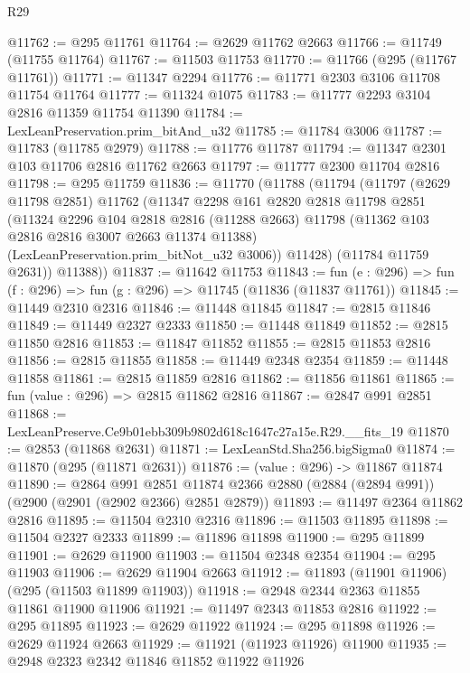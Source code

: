 \begin{lexlean}{R29}
\begin{coremodule}
@11762 := @295 @11761
@11764 := @2629 @11762 @2663
@11766 := @11749 (@11755 @11764)
@11767 := @11503 @11753
@11770 := @11766 (@295 (@11767 @11761))
@11771 := @11347 @2294
@11776 := @11771 @2303 @3106 @11708 @11754 @11764
@11777 := @11324 @1075
@11783 := @11777 @2293 @3104 @2816 @11359 @11754 @11390
@11784 := LexLeanPreservation.prim_bitAnd_u32
@11785 := @11784 @3006
@11787 := @11783 (@11785 @2979)
@11788 := @11776 @11787
@11794 := @11347 @2301 @103 @11706 @2816 @11762 @2663
@11797 := @11777 @2300 @11704 @2816
@11798 := @295 @11759
@11836 := @11770
    (@11788
      (@11794
        (@11797
          (@2629 @11798 @2851)
          @11762
          (@11347
            @2298
            @161
            @2820
            @2818
            @11798
            @2851
            (@11324
              @2296
              @104
              @2818
              @2816
              (@11288 @2663)
              @11798
              (@11362 @103 @2816 @2816 @3007 @2663 @11374 @11388)
              (LexLeanPreservation.prim_bitNot_u32 @3006))
            @11428)
          (@11784 @11759 @2631))
        @11388))
@11837 := @11642 @11753
@11843 := fun (e : @296) => fun (f : @296) => fun (g : @296) => @11745 (@11836 (@11837 @11761))
@11845 := @11449 @2310 @2316
@11846 := @11448 @11845
@11847 := @2815 @11846
@11849 := @11449 @2327 @2333
@11850 := @11448 @11849
@11852 := @2815 @11850 @2816
@11853 := @11847 @11852
@11855 := @2815 @11853 @2816
@11856 := @2815 @11855
@11858 := @11449 @2348 @2354
@11859 := @11448 @11858
@11861 := @2815 @11859 @2816
@11862 := @11856 @11861
@11865 := fun (value : @296) => @2815 @11862 @2816
@11867 := @2847 @991 @2851
@11868 := LexLeanPreserve.Ce9b01ebb309b9802d618c1647c27a15e.R29.__fits_19
@11870 := @2853 (@11868 @2631)
@11871 := LexLeanStd.Sha256.bigSigma0
@11874 := @11870 (@295 (@11871 @2631))
@11876 := (value : @296) -> @11867 @11874
@11890 := @2864
    @991
    @2851
    @11874
    @2366
    @2880
    (@2884 (@2894 @991))
    (@2900 (@2901 (@2902 @2366) @2851 @2879))
@11893 := @11497 @2364 @11862 @2816
@11895 := @11504 @2310 @2316
@11896 := @11503 @11895
@11898 := @11504 @2327 @2333
@11899 := @11896 @11898
@11900 := @295 @11899
@11901 := @2629 @11900
@11903 := @11504 @2348 @2354
@11904 := @295 @11903
@11906 := @2629 @11904 @2663
@11912 := @11893 (@11901 @11906) (@295 (@11503 @11899 @11903))
@11918 := @2948 @2344 @2363 @11855 @11861 @11900 @11906
@11921 := @11497 @2343 @11853 @2816
@11922 := @295 @11895
@11923 := @2629 @11922
@11924 := @295 @11898
@11926 := @2629 @11924 @2663
@11929 := @11921 (@11923 @11926) @11900
@11935 := @2948 @2323 @2342 @11846 @11852 @11922 @11926

\end{coremodule}
\end{lexlean}
